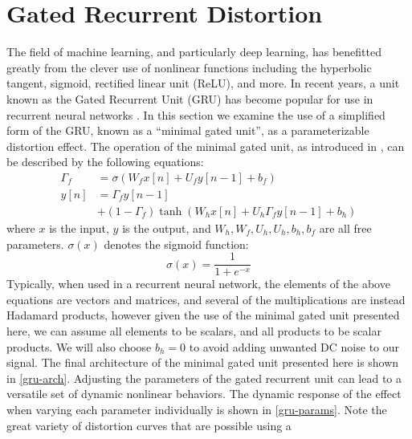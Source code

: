 \documentclass[twoside,a4paper]{article}
\begin{document}
\section{Gated Recurrent Distortion} \label{sec:GRU}
%
The field of machine learning, and particularly deep learning, has benefitted
greatly from the clever use of nonlinear functions including the hyperbolic
tangent, sigmoid, rectified linear unit (ReLU), and more. In recent years,
a unit known as the Gated Recurrent Unit (GRU) has become popular for
use in recurrent neural networks \cite{gru_original}. In this section
we examine the use of a simplified form of the GRU, known as a ``minimal
gated unit'', as a parameterizable distortion effect.
\newline\newline
The operation of the minimal gated unit, as introduced in
\cite{minimal-gated-unit}, can be described by the following equations:
%
\begin{equation}
    \begin{split}
        \Gamma_f &= \sigma (W_f x[n] + U_f y[n-1] + b_f) \\
        y[n] &= \Gamma_f y[n-1] \\
             &+ (1 - \Gamma_f) \tanh (W_h x[n] + U_h \Gamma_f y[n-1] + b_h)
    \end{split}
    \label{eq:minimal-gated-unit}
\end{equation}
%
where $x$ is the input, $y$ is the output, and $W_h,W_f,U_h,U_h,b_h,b_f$
are all free parameters. $\sigma(x)$ denotes the sigmoid function:
%
\begin{equation}
    \sigma(x) = \frac{1}{1 + e^{-x}}
    \label{eq:sigmoid}
\end{equation}
%
Typically, when used in a recurrent neural network, the elements of the
above equations are vectors and matrices, and several of the multiplications
are instead Hadamard products, however given the use of the minimal gated
unit presented here, we can assume all elements to be scalars, and all
products to be scalar products. We will also choose $b_h=0$ to avoid
adding unwanted DC noise to our signal. The final architecture of the
minimal gated unit presented here is shown in \cref{gru-arch}.
\newline\newline
Adjusting the parameters of the gated recurrent unit can lead to a versatile
set of dynamic nonlinear behaviors. The dynamic response of the effect
when varying each parameter individually is shown in \cref{gru-params}.
Note the great variety of distortion curves that are possible using a
\end{document}

